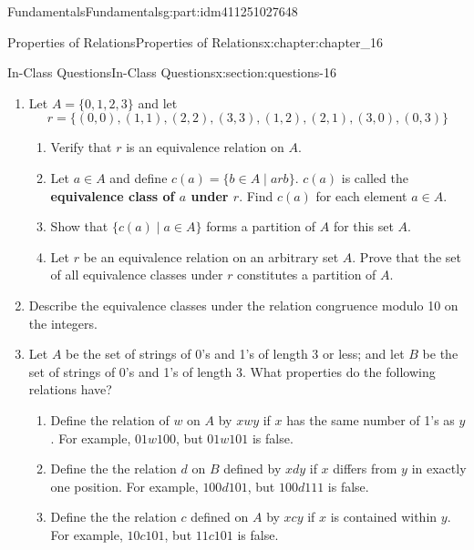\documentclass[oneside,10pt,]{book}
\newcommand{\terminology}[1]{\textbf{#1}}
\numberwithin{equation}{section}
\begin{document}
\begin{partptx}{Fundamentals}{}{Fundamentals}{}{}{g:part:idm411251027648}
\begin{chapterptx}{Properties of Relations}{}{Properties of Relations}{}{}{x:chapter:chapter_16}
\begin{sectionptx}{In-Class Questions}{}{In-Class Questions}{}{}{x:section:questions-16}
\begin{enumerate}[label=\arabic*.]
\begin{enumerate}[label=(\alph*)]
\item{}The first relation is  reflexive, symmetric, but not transitive.%
\item{}The second relation is transitive, but not symmetric and not reflexive.%
\item{}The third relation is both an equivalence relation and a partial ordering.%
\end{enumerate}
%
\item{}Let \(A = \{0, 1, 2, 3\}\) and let%
\begin{equation*}
r = \{(0, 0), (1, 1), (2, 2), (3, 3), (1, 2), (2, 1), (3, 0), (0, 3)\}
\end{equation*}
%
\begin{enumerate}[label=(\alph*)]
\item{}Verify that \(r\) is an equivalence relation on \(A\).%
\item{}Let \(a \in A\) and define \(c(a) = \{b \in A \mid a rb\}\). \label{g:notation:idm411250560944} \(c(a)\) is called the \terminology{equivalence class of \(a\) under \(r\)}. Find \(c(a)\) for each element \(a \in A\).%
\item{}Show that \(\{c(a) \mid  a \in A\}\) forms a partition of \(A\) for this set \(A\).%
\item{}Let \(r\) be an equivalence relation on an arbitrary set \(A\). Prove that the set of all equivalence classes under \(r\) constitutes a partition of \(A\).%
\end{enumerate}
%
\item{}Describe the equivalence classes under the relation congruence modulo 10 on the integers.%
\item{}Let \(A\) be the set of strings of 0's and 1's of length 3 or less; and let \(B\) be the set of strings of 0's and 1's of length 3. What properties do the following relations have?%
\begin{enumerate}[label=(\alph*)]
\item{}Define the relation of \(w\) on \(A\) by \(x w y\) if \(x\) has the same number of 1's as \(y\). For example, \(01 w 100\), but \(01 w 101\) is false.%
\item{}Define the the relation \(d\)  on \(B\) defined by \(x d y\) if \(x\) differs from \(y\) in exactly one position. For example, \(100 d 101\), but \(100 d 111\) is false.%
\item{}Define the the relation \(c\) defined  on \(A\) by \(x c y\) if \(x\) is contained within \(y\). For example, \(10 c 101\), but \(11 c 101\) is false.%

\end{enumerate}
\end{enumerate}
\end{sectionptx}
\end{chapterptx}
\end{partptx}
\end{document}
